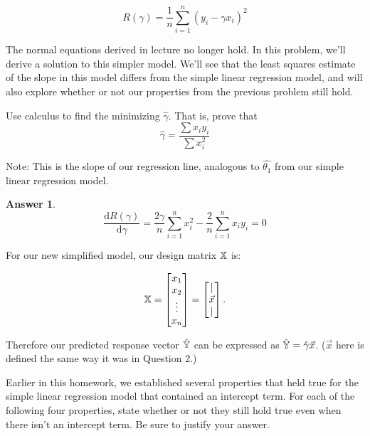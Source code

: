 \documentclass[addpoints, 12pt]{exam}
\theoremstyle{definition}
\newtheorem*{answer}{Answer}
\begin{document}
$$R(\gamma) = \frac{1}{n}\sum_{i=1}^n (y_i - \gamma x_i)^2$$

\noindent The normal equations derived in lecture no longer hold. In this problem, we'll derive a solution to this simpler model. We'll see that the least squares estimate of the slope in this model differs from the simple linear regression model, and will also explore whether or not our properties from the previous problem still hold.

\begin{questions}
    \setcounter{question}{2} %
\question[4] Use calculus to find the minimizing $\hat{\gamma}$.
That is, prove that 
$$ \hat{\gamma} = \frac{\sum x_iy_i}{\sum x_i^2}$$

Note: This is the slope of our regression line, analogous to $\hat{\theta_1}$ from our simple linear regression model.
    \begin{shaded}
    \begin{answer}

        \[\frac{\mathrm{d} R(\gamma)}{\mathrm{d} \gamma} = \frac{2\gamma}{n}\sum_{i=1}^{n}x_i^2-\frac{2}{n}\sum_{i=1}^{n}x_iy_i = 0\]

    \end{answer}
    \end{shaded}


\newpage
\question[8] 

For our new simplified model, our design matrix $\Bbb{X}$ is:

$$\Bbb{X} = \begin{bmatrix} x_1 \\ x_2 \\ \vdots \\ x_n \end{bmatrix} = \begin{bmatrix} | \\ \vec{x} \\ | \end{bmatrix}.$$

Therefore our predicted response vector $\hat{\Bbb{Y}}$ can be expressed as $\hat{\Bbb{Y}} = \hat{\gamma} \vec{x}$. ($\vec{x}$ here is defined the same way it was in Question 2.) 

Earlier in this homework, we established several properties that held true for the simple linear regression model that contained an intercept term. For each of the following four properties, state whether or not they still hold true even when there isn't an intercept term. Be sure to justify your answer.


\end{questions}
\end{document}
